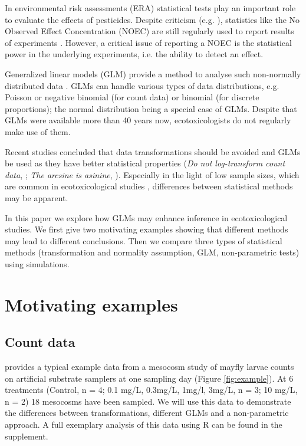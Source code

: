 \documentclass{scrartcl}
\begin{document}
In environmental risk assessments (ERA) statistical tests play an important role to evaluate the effects of pesticides. 
Despite criticism (e.g. \citet{landis_well_2011}), statistics like the No Observed Effect Concentration (NOEC) are still regularly used to report results of experiments \citep{jager_bad_2012}.
However, a critical issue of reporting a NOEC is the statistical power in the underlying experiments, i.e. the ability to detect an effect.

Generalized linear models (GLM) provide a method to analyse such non-normally distributed data \citep{nelder_generalized_1972}.
GLMs can handle various types of data distributions, e.g. Poisson or negative binomial (for count data) or binomial (for discrete proportions); the normal distribution being a special case of GLMs.
Despite that GLMs were available more than 40 years now, ecotoxicologists do not regularly make use of them.

Recent studies concluded that data transformations should be avoided and GLMs be used as they have better statistical properties (\emph{Do not log-transform count data}, \citep{ohara_not_2010}; \emph{The arcsine is asinine}, \citep{warton_arcsine_2011}).
Especially in the light of low sample sizes, which are common in ecotoxicological studies \citep{sanderson_pesticide_2002,szocs_analysing_2015}, differences between statistical methods may be apparent. 


In this paper we explore how GLMs may enhance inference in ecotoxicological studies.
We first give two motivating examples showing that different methods may lead to different conclusions. 
Then we compare three types of statistical methods (transformation and normality assumption, GLM, non-parametric tests) using simulations.


\newpage
\section{Motivating examples}
\subsection{Count data}
\citet{brock_minimum_2015} provides a typical example data from a mesocosm study of mayfly larvae counts on artificial substrate samplers at one sampling day (Figure \ref{fig:example}). 
At 6 treatments (Control, n = 4; 0.1 mg/L, 0.3mg/L, 1mg/l, 3mg/L, n = 3; 10 mg/L, n = 2) 18 mesocosms have been sampled.
We will use this data to demonstrate the differences between transformations, different GLMs and a non-parametric approach.
A full exemplary analysis of this data using R \citep{r_core_team_r:_2014} can be found in the supplement.
\end{document}
